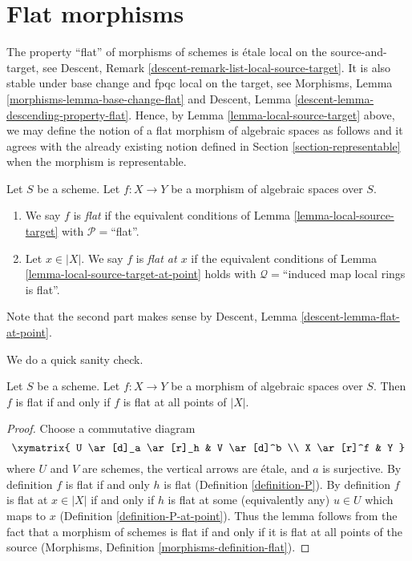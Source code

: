 \section{Flat morphisms}
\label{section-flat}

\noindent
The property ``flat'' of morphisms of schemes is
\'etale local on the source-and-target, see
Descent, Remark \ref{descent-remark-list-local-source-target}.
It is also stable under base change and fpqc local on the target, see
Morphisms, Lemma \ref{morphisms-lemma-base-change-flat} and
Descent, Lemma \ref{descent-lemma-descending-property-flat}.
Hence, by
Lemma \ref{lemma-local-source-target}
above, we may define the notion of a flat morphism of algebraic spaces as
follows and it agrees with the already existing notion defined in
Section \ref{section-representable}
when the morphism is representable.

\begin{definition}
\label{definition-flat}
Let $S$ be a scheme.
Let $f : X \to Y$ be a morphism of algebraic spaces over $S$.
\begin{enumerate}
\item We say $f$ is {\it flat} if the equivalent conditions of
Lemma \ref{lemma-local-source-target} with
$\mathcal{P} =$``flat''.
\item Let $x \in |X|$. We say $f$ is {\it flat at $x$} if the
equivalent conditions of
Lemma \ref{lemma-local-source-target-at-point}
holds with $\mathcal{Q} =$``induced map local rings is flat''.
\end{enumerate}
Note that the second part makes sense by
Descent, Lemma \ref{descent-lemma-flat-at-point}.
\end{definition}

\noindent
We do a quick sanity check.

\begin{lemma}
\label{lemma-flat-is-flat-at-all-points}
Let $S$ be a scheme. Let $f : X \to Y$ be a morphism of algebraic spaces
over $S$. Then $f$ is flat if and only if $f$ is flat at all points of $|X|$.
\end{lemma}

\begin{proof}
Choose a commutative diagram
$$
\xymatrix{
U \ar[d]_a \ar[r]_h & V \ar[d]^b \\
X \ar[r]^f & Y
}
$$
where $U$ and $V$ are schemes, the vertical arrows are \'etale, and
$a$ is surjective. By definition $f$ is flat if and only $h$ is flat
(Definition \ref{definition-P}).
By definition $f$ is flat at $x \in |X|$ if and only if $h$ is flat
at some (equivalently any) $u \in U$ which maps to $x$
(Definition \ref{definition-P-at-point}).
Thus the lemma follows from the fact that a morphism of schemes
is flat if and only if it is flat at all points of the source
(Morphisms, Definition \ref{morphisms-definition-flat}).
\end{proof}

